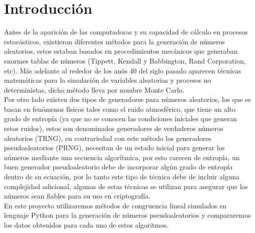 \documentclass[conference,a4paper]{IEEEtran}
\begin{document}
\section{\textbf{Introducci\'on}}
Antes de la aparici\'on de las computadoras y su capacidad de c\'alculo en procesos estoc\'asticos, existieron diferentes m\'etodos para la generaci\'on de n\'umeros aleatorios, estos estaban basados en procedimientos mec\'anicos que generaban enormes tablas de n\'umeros (Tippett, Kendall y Babbington, Rand Corporation, etc). M\'as adelante al rededor de los an\~os 40 del siglo pasado aparecen t\'ecnicas matem\'aticas para la simulaci\'on de variables aleatorias y procesos no deterministas, dicho m\'etodo lleva por nombre Monte Carlo.\\
Por otro lado existen dos tipos de generadores para n\'umeros aleatorios, los que se basan en fen\'omenos f\'isicos tales como el ruido atmosf\'erico, que tiene un alto grado de entrop\'ia (ya que no se conocen las condiciones iniciales que generan estos ruidos), estos son denominados generadores de verdaderos n\'umeros aleatorios (TRNG), en contrariedad con este m\'etodo los generadores pseudoaleatorios (PRNG), necesitan de un estado inicial para generar los n\'umeros mediante una secuencia algor\'itmica, por esto carecen de entrop\'ia, un buen generador pseudoaleatorio debe de incorporar alg\'un grado de entrop\'ia dentro de su ecuaci\'on, por lo tanto este tipo de t\'ecnica debe de incluir alguna complejidad adicional, algunas de estas t\'ecnicas se utilizan para asegurar que los n\'umeros sean fiables para su uso en criptograf\'ia.\\
En este proyecto utilizaremos m\'etodos de congruencia lineal simulados en lenguaje Python para la generaci\'on de n\'umeros pseudoaleatorios y compararemos los datos obtenidos para cada uno de estos algoritmos.
\end{document}
